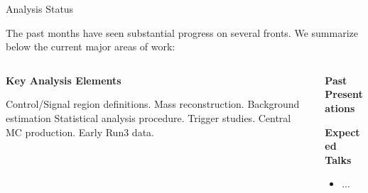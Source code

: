 \documentclass[10pt]{beamer}
\newcommand{\commonfiles}[1]{../common/#1}
\begin{document}
\begin{frame}{Analysis Status}
  \begin{block}{}
    The past months have seen substantial progress on several fronts. We summarize below the current major areas of work:
  \end{block}
  \begin{columns}[t]
    \begin{column}{0.5\textwidth}
      \begin{center} \textbf{Key Analysis Elements} \end{center}
      \begin{itemize}
         Control/Signal region definitions.
         Mass reconstruction. 
         Background estimation
         Statistical analysis procedure. 
         Trigger studies.
         Central MC production.
         Early Run3 data.
      \end{itemize}
    \end{column}
    \begin{column}{0.5\textwidth}
      \begin{center} \textbf{Past Presentations} \end{center}
      \begin{itemize}
        }
      \end{itemize}
      \begin{center} \textbf{Expected Talks} \end{center}
      \begin{itemize}
      \item ...
      \end{itemize}
    \end{column}
  \end{columns}

  \begin{center}
  \end{center}
\end{frame}
\end{document}
